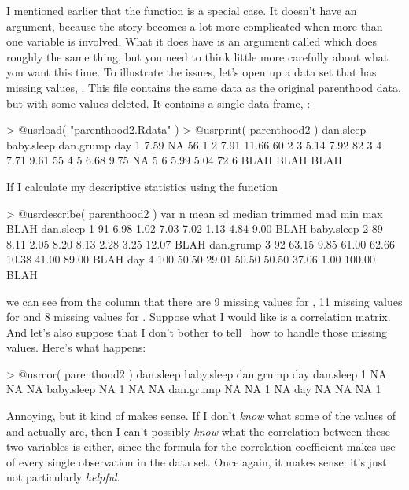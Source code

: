 I mentioned earlier that the  function is a special case. It doesn't have an  argument, because the story becomes a lot more complicated when more than one variable is involved. What it does have is an argument called  which does roughly the same thing, but you need to think  little more carefully about what you want this time. To illustrate the issues, let's open up a data set that has missing values, . This file contains the same data as the original parenthood data, but with some values deleted. It contains a single data frame, :
\begin{rblock1}
> @usr{load( "parenthood2.Rdata" )}
> @usr{print( parenthood2 )}
  dan.sleep baby.sleep dan.grump day
1      7.59         NA        56   1
2      7.91      11.66        60   2
3      5.14       7.92        82   3
4      7.71       9.61        55   4
5      6.68       9.75        NA   5
6      5.99       5.04        72   6
BLAH BLAH BLAH
\end{rblock1}
If I calculate my descriptive statistics using the  function
\begin{rblock1}
> @usr{describe( parenthood2 )}
           var   n  mean    sd median trimmed   mad   min    max    BLAH
dan.sleep    1  91  6.98  1.02   7.03    7.02  1.13  4.84   9.00    BLAH
baby.sleep   2  89  8.11  2.05   8.20    8.13  2.28  3.25  12.07    BLAH
dan.grump    3  92 63.15  9.85  61.00   62.66 10.38 41.00  89.00    BLAH
day          4 100 50.50 29.01  50.50   50.50 37.06  1.00 100.00    BLAH
\end{rblock1}
we can see from the  column that there are 9 missing values for , 11 missing values for  and 8 missing values for . Suppose what I would like is a correlation matrix. And let's also suppose that I don't bother to tell \R\ how to handle those missing values. Here's what happens:
\begin{rblock1}
> @usr{cor( parenthood2 )}
           dan.sleep baby.sleep dan.grump day
dan.sleep          1         NA        NA  NA
baby.sleep        NA          1        NA  NA
dan.grump         NA         NA         1  NA
day               NA         NA        NA   1
\end{rblock1}
Annoying, but it kind of makes sense. If I don't {\it know} what some of the values of  and  actually are, then I can't possibly {\it know} what the correlation between these two variables is either, since the formula for the correlation coefficient makes use of every single observation in the data set. Once again, it makes sense: it's just not particularly {\it helpful}.

